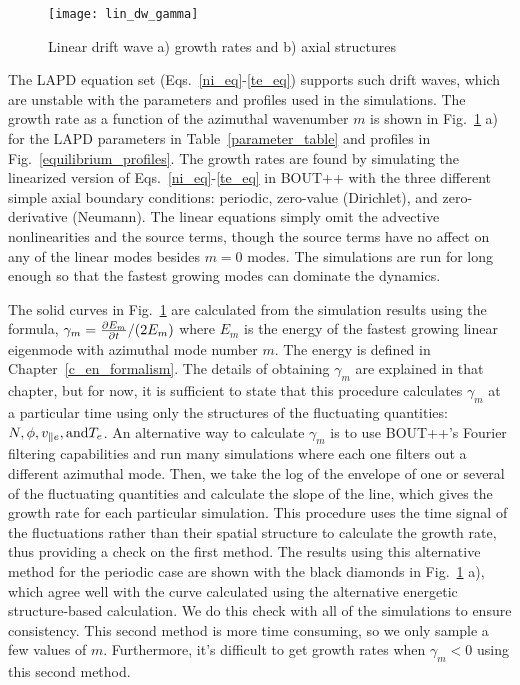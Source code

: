 \begin{figure}[!ht]
\centerline{\texttt{[image: lin\_dw\_gamma]}}
\caption{Linear drift wave a) growth rates and b) axial structures}
\label{lin_dw_gamma}
\end{figure}

The LAPD equation set (Eqs.~\ref{ni_eq}-\ref{te_eq}) supports such drift waves, which are unstable with the parameters and profiles used in the simulations. 
The growth rate as a function of the azimuthal
wavenumber $m$ is shown in Fig.~\ref{lin_dw_gamma} a) for the LAPD parameters in Table~\ref{parameter_table} and profiles in Fig.~\ref{equilibrium_profiles}. The growth rates are found by simulating
the linearized version of Eqs.~\ref{ni_eq}-\ref{te_eq} in BOUT++ with the three different simple axial boundary conditions: periodic, zero-value (Dirichlet), and zero-derivative (Neumann). 
The linear equations simply omit the advective nonlinearities and the source terms, though the source terms have no affect on any of the linear modes besides $m=0$ modes. The simulations are run
for long enough so that the fastest growing modes can dominate the dynamics.

The solid curves in Fig.~\ref{lin_dw_gamma} are calculated from the simulation results using the formula, $\gamma_m = \frac{\partial E_m}{\partial t}/(2 E_m)$ where $E_m$ is the energy of the fastest
growing linear eigenmode with azimuthal mode number $m$.
The energy is defined in Chapter~\ref{c_en_formalism}. The details of obtaining $\gamma_m$ are explained in that chapter, but for now, it is sufficient to state that this procedure calculates
$\gamma_m$ at a particular time using only the structures of the fluctuating quantities: $N, \phi, v_{\parallel e}, {\rm and } T_e$. An alternative way to calculate $\gamma_m$ is to use BOUT++'s Fourier
filtering capabilities and run many simulations where each one filters out a different azimuthal mode. Then, we take the log of the envelope of one or several of the fluctuating quantities
and calculate the slope of the line, which gives the growth rate for each particular simulation. This procedure uses the time signal of the fluctuations rather than their spatial structure to
calculate the growth rate, thus providing a check on the first method. 
The results using this alternative method for the periodic case are shown with the black diamonds in Fig.~\ref{lin_dw_gamma} a), which agree well with the curve calculated using the 
alternative energetic structure-based calculation. We do this check with all of the simulations to ensure consistency. This second method is more time consuming, so we only sample a few values of $m$.
Furthermore, it's difficult to get growth rates when $\gamma_m < 0$ using this second method.

